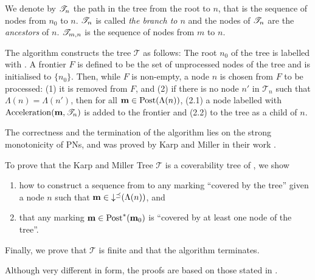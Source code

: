 We denote by $\mathscr{T}_{n}$ the path in the tree from the root to $n$, that is the sequence of nodes from $n_0$ to $n$.
$\mathscr{T}_{n}$ is called \emph{the branch to $n$} and the nodes of $\mathscr{T}_{n}$ are the \emph{ancestors} of $n$.
$\mathscr{T}_{m,n}$ is the sequence of nodes from $m$ to $n$.

The algorithm constructs the tree $\mathcal{T}$ as follows:
The root $n_0$ of the tree is labelled with \mari.
A frontier $F$ is defined to be the set of unprocessed nodes of the tree and is initialised to $\{n_0\}$.
Then, while $F$ is non-empty, a node $n$ is chosen from $F$ to be processed:
(1) it is removed from $F$, and (2) if there is no node $n'$ in $\mathscr{T}_n$ such that $\Lambda(n) = \Lambda(n')$, then for all \omark $\mathbf{m} \in \operatorname{Post}(\Lambda(n))$, (2.1) a node labelled with $\operatorname{Acceleration}(\mathbf{m}, \mathscr{T}_n)$ is added to the frontier and (2.2) to the tree as a child of $n$.

The correctness and the termination of the algorithm lies on the strong monotonicity of \acp{PN}, and was proved by Karp and Miller in their work \cite{Karp69}.


To prove that the Karp and Miller Tree $\mathcal{T}$ is a coverability tree of \N, we show
\begin{enumerate}
  \item how to construct a sequence from \mari to any marking \mar “covered by the tree” given a node $n$ such that $\mathbf{m} \in \operatorname{\downarrow^\preceq}(\Lambda(n))$, and
  \item that any marking $\mathbf{m} \in \operatorname{Post}^*(\mathbf{m}_0)$ is “covered by at least one node of the tree”.
\end{enumerate}

Finally, we prove that $\mathcal{T}$ is finite and that the algorithm terminates.

Although very different in form, the proofs are based on those stated in \cite{Karp69}.

